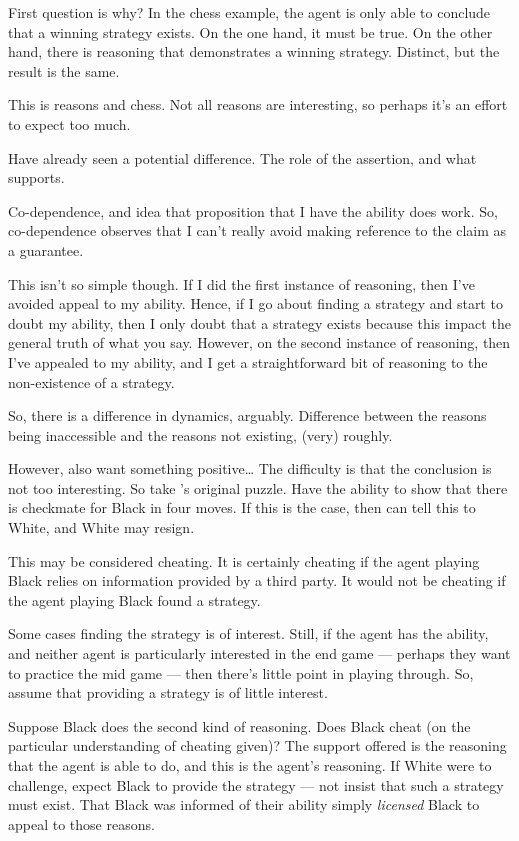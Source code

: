 \documentclass[10pt]{article}
\begin{document}
\begin{note}[Why]
  First question is why?
  In the chess example, the agent is only able to conclude that a winning strategy exists.
  On the one hand, it must be true.
  On the other hand, there is reasoning that demonstrates a winning strategy.
  Distinct, but the result is the same.

  This is reasons and chess.
  Not all reasons are interesting, so perhaps it's an effort to expect too much.

  Have already seen a potential difference.
  The role of the assertion, and what supports.

  Co-dependence, and idea that proposition that I have the ability does work.
  So, co-dependence observes that I can't really avoid making reference to the claim as a guarantee.

  This isn't so simple though.
  If I did the first instance of reasoning, then I've avoided appeal to my ability.
  Hence, if I go about finding a strategy and start to doubt my ability, then I only doubt that a strategy exists because this impact the general truth of what you say.
  However, on the second instance of reasoning, then I've appealed to my ability, and I get a straightforward bit of reasoning to the non-existence of a strategy.

  So, there is a difference in dynamics, arguably.
  Difference between the reasons being inaccessible and the reasons not existing, (very) roughly.

  However, also want something positive\dots
  The difficulty is that the conclusion is not too interesting.
  So take \citeauthor{Emms:2000aa}'s original puzzle.
  Have the ability to show that there is checkmate for Black in four moves.
  If this is the case, then can tell this to White, and White may resign.

  This may be considered cheating.
  It is certainly cheating if the agent playing Black relies on information provided by a third party.
  It would not be cheating if the agent playing Black found a strategy.

  Some cases finding the strategy is of interest.
  Still, if the agent has the ability, and neither agent is particularly interested in the end game --- perhaps they want to practice the mid game --- then there's little point in playing through.
  So, assume that providing a strategy is of little interest.

  Suppose Black does the second kind of reasoning.
  Does Black cheat (on the particular understanding of cheating given)?
  The support offered is the reasoning that the agent is able to do, and this is the agent's reasoning.
  If White were to challenge, expect Black to provide the strategy --- not insist that such a strategy must exist.
  That Black was informed of their ability simply \emph{licensed} Black to appeal to those reasons.


\end{note}
\end{document}
